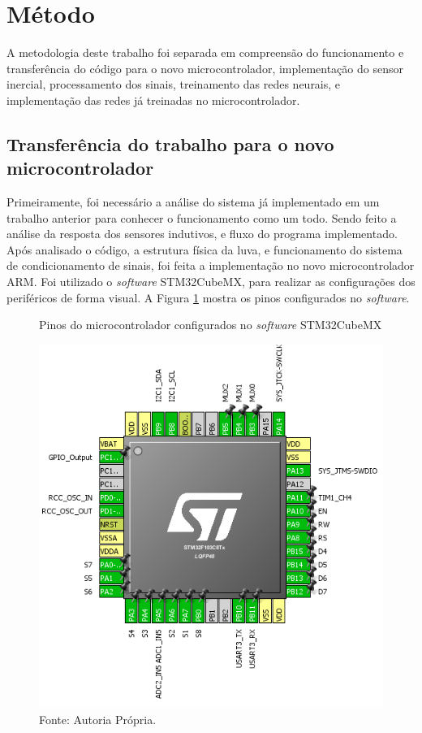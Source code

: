 \section{Método}
A metodologia deste trabalho foi separada em compreensão do funcionamento e transferência do código para o novo microcontrolador, implementação do sensor inercial, processamento dos sinais, treinamento das redes neurais, e implementação das redes já treinadas no microcontrolador.

\subsection{Transferência do trabalho para o novo microcontrolador}
\label{sec:transf}
Primeiramente, foi necessário a análise do sistema já implementado em um trabalho anterior para conhecer o funcionamento como um todo.
Sendo feito a análise da resposta dos sensores indutivos, e fluxo do programa implementado. Após analisado o código, a estrutura física da luva, e funcionamento do sistema de condicionamento de sinais, foi feita a implementação no novo microcontrolador ARM. Foi utilizado o \textit{software} STM32CubeMX, para realizar as configurações dos periféricos de forma visual. A Figura \ref{fig:cubePinagem} mostra os pinos configurados no \textit{software}.

\begin{figure}[H]
	\centering
	\vspace{4mm}
		\caption{Pinos do microcontrolador configurados no \textit{software} STM32CubeMX}
			\label{fig:cubePinagem}
	\includegraphics[scale=0.7]{imagens/pinagem_microcontrolador}
	\caption*{Fonte: Autoria Própria.}

\end{figure}


